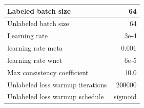 \begin{tabular}{L{\WWW}  R{\RRR}}
\\ \hline
Labeled batch size & 64
\\ \hline
Unlabeled batch size & 64
\\ \hline
Learning rate & 3e-4
\\ \hline
learning rate meta & 0.001
\\ \hline
learning rate wnet & 6e-5
\\ \hline
Max consistency coefficient & 10.0
\\ \hline
Unlabeled loss warmup iterations & 200000
\\ \hline
Unlabeled loss warmup schedule & sigmoid

\end{tabular}